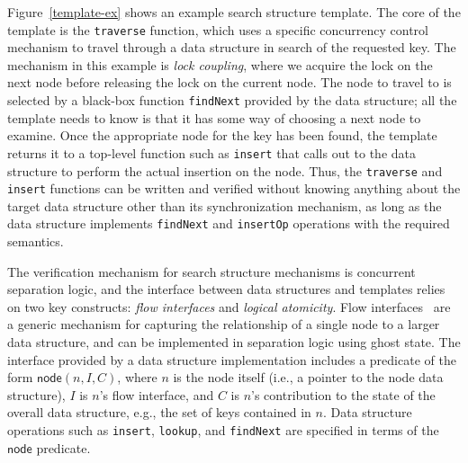 \documentclass[sigplan,screen]{acmart}
\newcommand{\node}[3]{\ensuremath{\mathsf{node}(#1, #2, #3)}}
\begin{document}
Figure~\ref{template-ex} shows an example search structure template. The core of the template is the \lstinline{traverse} function, which uses a specific concurrency control mechanism to travel through a data structure in search of the requested key. The mechanism in this example is \emph{lock coupling}, where we acquire the lock on the next node before releasing the lock on the current node. The node to travel to is selected by a black-box function \lstinline{findNext} provided by the data structure; all the template needs to know is that it has some way of choosing a next node to examine. Once the appropriate node for the key has been found, the template returns it to a top-level function such as \lstinline{insert} that calls out to the data structure to perform the actual insertion on the node. Thus, the \lstinline{traverse} and \lstinline{insert} functions can be written and verified without knowing anything about the target data structure other than its synchronization mechanism, as long as the data structure implements \lstinline{findNext} and \lstinline{insertOp} operations with the required semantics.

The verification mechanism for search structure mechanisms is concurrent separation logic, and the interface between data structures and templates relies on two key constructs: \emph{flow interfaces} and \emph{logical atomicity}. Flow interfaces~\cite{krishna2017flow} are a generic mechanism for capturing the relationship of a single node to a larger data structure, and can be implemented in separation logic using ghost state. The interface provided by a data structure implementation includes a predicate of the form $\node{n}{I}{C}$, where $n$ is the node itself (i.e., a pointer to the node data structure), $I$ is $n$'s flow interface, and $C$ is $n$'s contribution to the state of the overall data structure, e.g., the set of keys contained in $n$. Data structure operations such as \lstinline{insert}, \lstinline{lookup}, and \lstinline{findNext} are specified in terms of the $\mathsf{node}$ predicate. %
\end{document}
